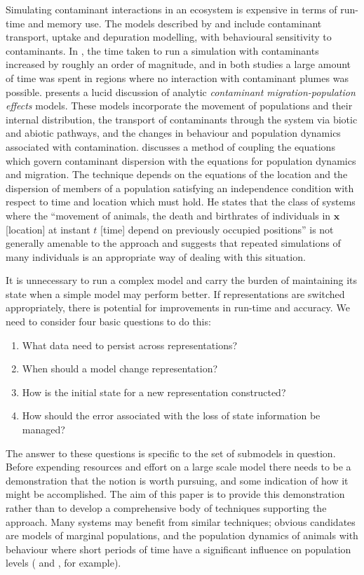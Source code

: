 Simulating contaminant interactions in an ecosystem is expensive in terms of
run-time and memory use. The models described by \citeauthor{Gray06:1} and
\citeauthor{Lyne94:1} include contaminant transport, uptake and depuration
modelling, with behavioural sensitivity to contaminants. In \citeauthor{Gray06:1},
the time taken to run a simulation with contaminants increased by roughly an
order of magnitude, and in both studies a large amount of time was spent in
regions where no interaction with contaminant plumes was possible.
\citet{Monte09:1} presents a lucid discussion of analytic {\em{contaminant
migration-population effects}\/} models. These models incorporate the movement
of populations and their internal distribution, the transport of contaminants
through the system via biotic and abiotic pathways, and the changes in
behaviour and population dynamics associated with contamination.
 discusses a method of coupling the equations which govern
contaminant dispersion with the equations for population dynamics and
migration. The technique depends on the equations of the location and the
dispersion of members of a population satisfying an independence condition
with respect to time and location which must hold. He states that the class of
systems where the ``movement of animals, the death and birthrates of
individuals in $\mathbf{x}$ [location] at instant $t$ [time] depend on
previously occupied positions'' is not generally amenable to the approach and
suggests that repeated simulations of many individuals is an appropriate way
of dealing with this situation.

It is unnecessary to run a complex model and carry the burden of maintaining
its state when a simple model may perform better. If representations are
switched appropriately, there is potential for improvements in run-time and
accuracy. We need to consider four basic questions to do this:
\begin{enumerate}
  \item What data need to persist across representations?\label{Q1}
  
  \item When should a model change representation?\label{Q2}
  
  \item How is the initial state for a new representation
  constructed?\label{Q3}
  
  \item How should the error associated with the loss of state information be
  managed?\label{Q4}
\end{enumerate}
The answer to these questions is specific to the set of submodels in question.
Before expending resources and effort on a large scale model there needs to be
a demonstration that the notion is worth pursuing, and some indication of how
it might be accomplished. The aim of this paper is to provide this
demonstration rather than to develop a comprehensive body of techniques
supporting the approach. Many systems may benefit from similar techniques;
obvious candidates are models of marginal populations, and the population
dynamics of animals with behaviour where short periods of time have a
significant influence on population levels (\citet{Wolff94:1} and
\citet{Elderd08:1}, for example).

